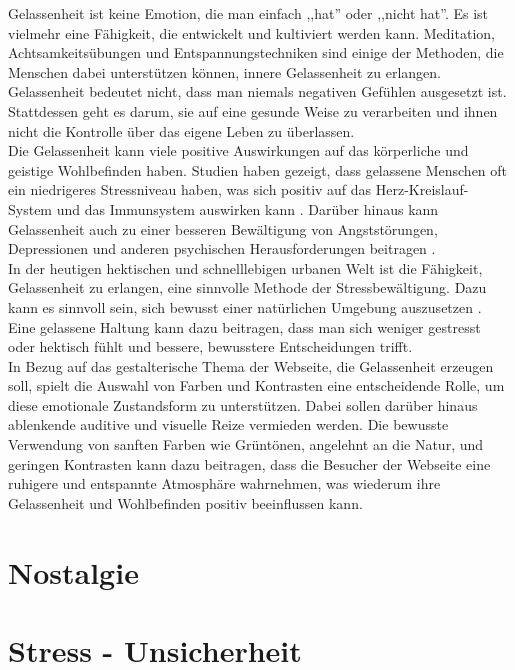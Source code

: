 \documentclass[./dokumentation.tex]{subfiles}
\begin{document}
Gelassenheit ist keine Emotion, die man einfach ,,hat'' oder ,,nicht hat''. Es ist vielmehr eine Fähigkeit, die entwickelt und kultiviert werden kann. Meditation, Achtsamkeitsübungen und Entspannungstechniken sind einige der Methoden, die Menschen dabei unterstützen können, innere Gelassenheit zu erlangen. Gelassenheit bedeutet nicht, dass man niemals negativen Gefühlen ausgesetzt ist. Stattdessen geht es darum, sie auf eine gesunde Weise zu verarbeiten und ihnen nicht die Kontrolle über das eigene Leben zu überlassen. \\
Die Gelassenheit kann viele positive Auswirkungen auf das körperliche und geistige Wohlbefinden haben. Studien haben gezeigt, dass gelassene Menschen oft ein niedrigeres Stressniveau haben, was sich positiv auf das Herz-Kreislauf-System und das Immunsystem auswirken kann \cite{chin2021}. Darüber hinaus kann Gelassenheit auch zu einer besseren Bewältigung von Angststörungen, Depressionen und anderen psychischen Herausforderungen beitragen \cite{monahan1986}. \\
In der heutigen hektischen und schnelllebigen urbanen Welt ist die Fähigkeit, Gelassenheit zu erlangen, eine sinnvolle Methode der Stressbewältigung. Dazu kann es sinnvoll sein, sich bewusst einer natürlichen Umgebung auszusetzen \cite{vandenbosch2015}. Eine gelassene Haltung kann dazu beitragen, dass man sich weniger gestresst oder hektisch fühlt und bessere, bewusstere Entscheidungen trifft. \\
In Bezug auf das gestalterische Thema der Webseite, die Gelassenheit erzeugen soll, spielt die Auswahl von Farben und Kontrasten eine entscheidende Rolle, um diese emotionale Zustandsform zu unterstützen. Dabei sollen darüber hinaus ablenkende auditive und visuelle Reize vermieden werden. Die bewusste Verwendung von sanften Farben wie Grüntönen, angelehnt an die Natur, und geringen Kontrasten kann dazu beitragen, dass die Besucher der Webseite eine ruhigere und entspannte Atmosphäre wahrnehmen, was wiederum ihre Gelassenheit und Wohlbefinden positiv beeinflussen kann.

\section{Nostalgie}

\section{Stress - Unsicherheit}
\end{document}
